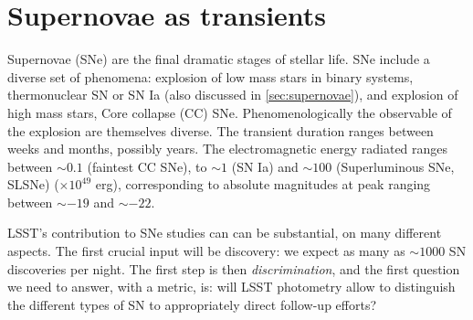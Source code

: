 %
%
%
%
%
%
%
%

\section{Supernovae as transients}
\def\secname{SNtransients}\label{sec:\secname} %


Supernovae (SNe) are the final dramatic stages of stellar life. SNe include a diverse set of phenomena: explosion of low mass stars in binary systems, thermonuclear SN or SN Ia (also discussed in \ref{sec:supernovae}), and explosion of high mass stars, Core collapse (CC) SNe. Phenomenologically the observable of the explosion are themselves diverse.  The transient duration ranges between weeks and months, possibly years. The electromagnetic energy radiated ranges between $\sim0.1$ (faintest CC SNe), to $\sim1$ (SN Ia) and $\sim100$ (Superluminous SNe, SLSNe) ($\times 10^{49}$ erg), corresponding to absolute magnitudes at peak ranging between $\sim-19$ and $\sim-22$.

LSST's contribution to SNe studies can can be substantial, on many different aspects. The first crucial input will be discovery: we expect as many as $\sim 1000$ SN discoveries per night. The first step is then \emph{discrimination}, and the first question we need to answer, with a metric, is: will LSST photometry allow to distinguish the different types of SN to appropriately direct follow-up efforts?


